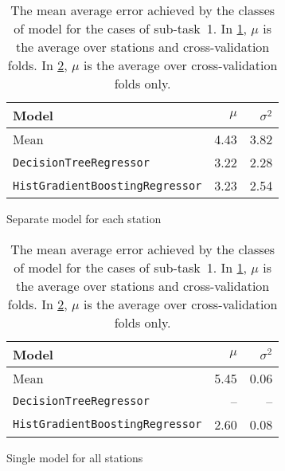 \documentclass[11pt]{extarticle}
\begin{document}
\begin{table}
  \centering
  \begin{subfigure}{\textwidth}
    \centering
    \begin{tabular}{lrr}
      \toprule
      Model                                  & $\mu$ & $\sigma^2$
      \\
      \midrule
      Mean                                   & 4.43  & 3.82
      \\
      \texttt{DecisionTreeRegressor}         & 3.22  & 2.28
      \\
      \texttt{HistGradientBoostingRegressor} & 3.23  & 2.54
      \\
      \bottomrule
    \end{tabular}
    \caption{Separate model for each station}
    \label{tab:chart-subtask-1-1}
  \end{subfigure}
  \par\bigskip\bigskip
  \begin{subfigure}{\textwidth}
    \centering
    \begin{tabular}{lrr}
      \toprule
      Model                                  & $\mu$ & $\sigma^2$
      \\
      \midrule
      Mean                                   & 5.45  & 0.06
      \\
      \texttt{DecisionTreeRegressor}         & --    & --
      \\
      \texttt{HistGradientBoostingRegressor} & 2.60  & 0.08
      \\
      \bottomrule
    \end{tabular}
    \caption{Single model for all stations}
    \label{tab:chart-subtask-1-2}
  \end{subfigure}
  \caption{The mean average error achieved by the classes of model for the cases of sub-task~1.
    In \cref{tab:chart-subtask-1-1}, $\mu$ is the average over stations and cross-validation folds.
    In \cref{tab:chart-subtask-1-2}, $\mu$ is the average over cross-validation folds only.
  }
  \label{tab:chart-subtask-1}
\end{table}

\printbibliography
\end{document}

